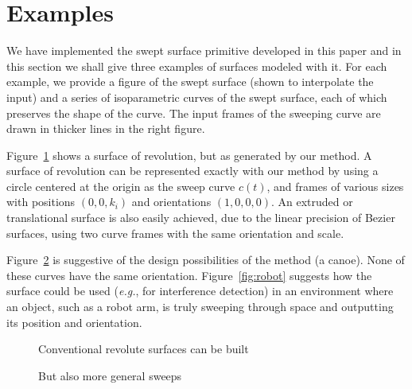 \section{Examples}
\label{sec:eg}

We have implemented the swept surface primitive developed in this paper
and in this section we shall give three examples of surfaces modeled with it.
For each example, we provide a figure of the
swept surface (shown to interpolate the input)
and a series of isoparametric curves of the swept surface,
each of which preserves the shape of the curve.
The input frames of the sweeping curve are drawn in thicker lines in the 
right figure.

Figure~\ref{fig:coke} shows a surface of revolution, but as generated
by our method.
A surface of revolution can be represented exactly with our method
by using a circle 
centered at the origin
as the sweep curve $c(t)$, and frames of various sizes with positions
$(0,0,k_i)$ and orientations $(1,0,0,0)$.
An extruded  or translational surface is also easily achieved, due to
the linear precision of Bezier surfaces, using two curve frames
with the same orientation and scale.

Figure~\ref{fig:canoe} is suggestive of the design
possibilities of the method (a canoe).
None of these curves have the same orientation.
Figure~\ref{fig:robot} suggests how the surface could be used ({\em e.g.}, for 
interference detection) in an environment
where an object, such as a robot arm, is truly sweeping through space
and outputting its position and orientation.

\begin{figure}
\vspace{2.75in}
\caption{Conventional revolute surfaces can be built}
\label{fig:coke}
\end{figure}


\begin{figure}
\vspace{2.75in}
\caption{But also more general sweeps}
\label{fig:canoe}
\end{figure}

